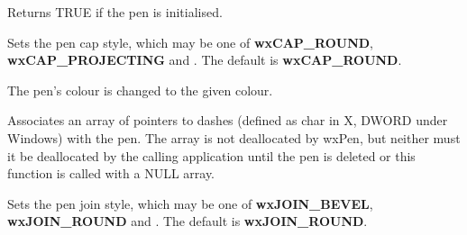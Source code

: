 \label{wxpenok}


Returns TRUE if the pen is initialised.

\label{wxpensetcap}


Sets the pen cap style, which may be one of {\bf wxCAP\_ROUND}, {\bf wxCAP\_PROJECTING} and
. The default is {\bf wxCAP\_ROUND}.



\label{wxpensetcolour}




The pen's colour is changed to the given colour.



\label{wxpensetdashes}


Associates an array of pointers to dashes (defined as char in X, DWORD under Windows)
with the pen. The array is not deallocated by wxPen, but neither must it be
deallocated by the calling application until the pen is deleted or this
function is called with a NULL array.



\label{wxpensetjoin}


Sets the pen join style, which may be one of {\bf wxJOIN\_BEVEL}, {\bf wxJOIN\_ROUND} and
. The default is {\bf wxJOIN\_ROUND}.



\label{wxpensetstipple}

